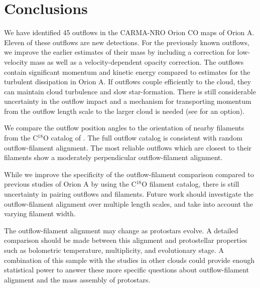 \documentclass[twocolumn]{aastex63}
\begin{document}
\section{Conclusions}\label{sec:conclusions}

We have identified 45 outflows in the CARMA-NRO Orion CO maps of Orion A. Eleven of these outflows are new detections. For the previously known outflows, we improve the earlier estimates of their mass by including a correction for low-velocity mass as well as a velocity-dependent opacity correction.
The outflows contain significant momentum and kinetic energy compared to estimates for the turbulent dissipation in Orion A. If outflows couple efficiently to the cloud, they can maintain cloud turbulence and slow star-formation. There is still considerable uncertainty in the outflow impact and a mechanism for transporting momentum from the outflow length scale to the larger cloud is needed (see \citealt{Offner18} for an option).

We compare the outflow position angles to the orientation of nearby filaments from the C$^{18}$O catalog of \citet{Suri19}. The full outflow catalog is consistent with random outflow-filament alignment. The most reliable outflows which are closest to their filaments show a moderately perpendicular outflow-filament alignment.


While we improve the specificity of the outflow-filament comparison compared to previous studies of Orion A by using the C$^{18}$O filament catalog, there is still uncertainty in pairing outflows and filaments. Future work should investigate the outflow-filament alignment over multiple length scales, and take into account the varying filament width.

The outflow-filament alignment may change as protostars evolve. A detailed comparison should be made between this alignment and protostellar properties such as bolometric temperature, multiplicity, and evolutionary stage. A combination of this sample with the studies in other clouds could provide enough statistical power to answer these more specific questions about outflow-filament alignment and the mass assembly of protostars.
\clearpage
\startlongtable

\clearpage
\startlongtable

\startlongtable
\clearpage


\clearpage
\end{document}
